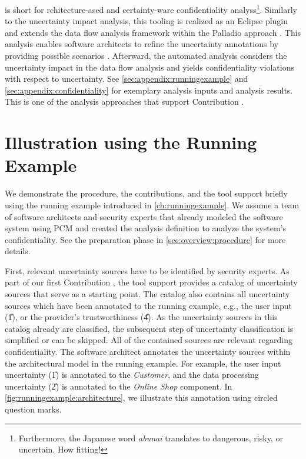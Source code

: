 \abunai is short for rchitecture-ased and certainty-ware confidentiality analyss\footnote{Furthermore, the Japanese word \emph{abunai} translates to dangerous, risky, or uncertain. How fitting!}.
Similarly to the uncertainty impact analysis, this tooling is realized as an Eclipse plugin and extends the data flow analysis framework \cite{boltz_extensible_2024} within the Palladio approach \cite{reussner_modeling_2016}.
This analysis enables software architects to refine the uncertainty annotations by providing possible scenarios \cite{hahner_model-based_2023}.
Afterward, the automated analysis considers the uncertainty impact in the data flow analysis and yields confidentiality violations with respect to uncertainty.
See \autoref{sec:appendix:runningexample} and \autoref{sec:appendix:confidentiality} for exemplary analysis inputs and analysis results.
This is one of the analysis approaches that support Contribution .





\section{Illustration using the Running Example}%
\label{sec:overview:illustration}

We demonstrate the procedure, the contributions, and the tool support briefly using the running example introduced in \autoref{ch:runningexample}.
We assume a team of software architects and security experts that already modeled the software system using \ac{PCM} and created the analysis definition to analyze the system's confidentiality.
See the preparation phase in \autoref{sec:overview:procedure} for more details.

First, relevant uncertainty sources have to be identified by security experts.
As part of our first Contribution , the tool support \arcen provides a catalog of uncertainty sources that serve as a starting point.
The catalog also contains all uncertainty sources which have been annotated to the running example, e.g., the user input (\U{1}), or the provider's trustworthiness (\U{4}).
As the uncertainty sources in this catalog already are classified, the subsequent step of uncertainty classification is simplified or can be skipped.
All of the contained sources are relevant regarding confidentiality.
The software architect annotates the uncertainty sources within the architectural model in the running example.
For example, the user input uncertainty (\U{1}) is annotated to the \emph{Customer}, and the data processing uncertainty (\U{2}) is annotated to the \emph{Online Shop} component.
In \autoref{fig:runningexample:architecture}, we illustrate this annotation using circled question marks.

